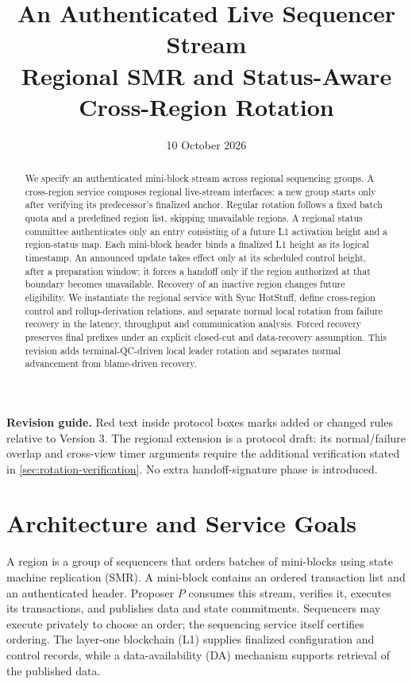\documentclass[11pt,a4paper,onecolumn]{article}
\title{An Authenticated Live Sequencer Stream\\
\large Regional SMR and Status-Aware Cross-Region Rotation}
\author{}\date{10 October 2026}
\newcounter{protocol}
\begin{document}
\maketitle
\begin{abstract}
We specify an authenticated mini-block stream across regional sequencing
groups. A cross-region service composes regional live-stream interfaces:
a new group starts only after verifying its predecessor's finalized anchor.
Regular rotation follows a fixed batch quota and a predefined region list,
skipping unavailable regions. A regional status committee authenticates only
an entry consisting of a future L1 activation height and a region-status
map. Each mini-block header binds a finalized L1 height as its logical
timestamp. An announced update takes effect only at its scheduled control
height, after a preparation window; it forces a handoff only if the region
authorized at that boundary becomes unavailable. Recovery of an inactive
region changes future eligibility. We instantiate
the regional service with Sync HotStuff, define cross-region control and
rollup-derivation relations, and separate normal local rotation from failure recovery in the latency,
throughput and communication analysis. Forced recovery preserves final
prefixes under an explicit closed-cut and data-recovery assumption.
This revision adds terminal-QC-driven local leader rotation and separates
normal advancement from blame-driven recovery.
\end{abstract}

\noindent\textbf{Revision guide.} Red text inside protocol boxes marks added
or changed rules relative to Version 3. The regional extension is a protocol
draft: its normal/failure overlap and cross-view timer arguments require
the additional verification stated in \cref{sec:rotation-verification}.
No extra handoff-signature phase is introduced.

\section{Architecture and Service Goals}\label{sec:architecture}
A region is a group of sequencers that orders batches of mini-blocks using
state machine replication (SMR). A mini-block contains an ordered transaction
list and an authenticated header. Proposer $P$ consumes this stream, verifies
it, executes its transactions, and publishes data and state commitments.
Sequencers may execute privately to choose an order; the sequencing service
itself certifies ordering. The layer-one blockchain (L1) supplies finalized
configuration and control records, while a data-availability (DA) mechanism
supports retrieval of the published data.
\end{document}
